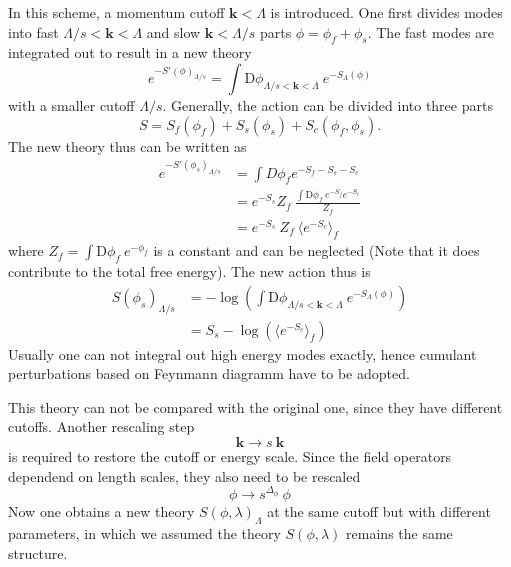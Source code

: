 \documentclass[submission, PhysLectNotes]{SciPost}
\begin{document}
In this scheme, a momentum cutoff $\boldsymbol{k}<\Lambda$ is introduced. One first divides modes into fast $\Lambda/s<\boldsymbol{k}<\Lambda$ and slow $\boldsymbol{k}<\Lambda/s$ parts $\phi = \phi_f +\phi_s$. The fast modes are integrated out to result in a new theory
\begin{equation}
    e^{-{S'(\phi)}_{\Lambda/s}} = \int \mathrm{D}\phi_{\Lambda/s<\boldsymbol{k}<\Lambda} \ e^{-S_{\Lambda}(\phi)}
\end{equation}
with a smaller cutoff $\Lambda/s$. Generally, the action can be divided into three parts
\begin{equation}
S = S_f(\phi_f) + S_s(\phi_s) + S_c(\phi_f,\phi_s).
\end{equation}
The new theory thus can be written as
\begin{equation}
\begin{aligned}
    e^{-{S'(\phi_s)}_{\Lambda/s}} &= \int D\phi_f e^{-S_f - S_s - S_c} \\
    &= e^{-S_s} Z_f \ \frac{\int \mathrm{D}\phi_f \ e^{-S_f} e^{-S_c}} {Z_f} \\
    &= e^{-S_s}\ Z_f \ \langle e^{-S_c} \rangle_f
\end{aligned}
\end{equation}
where $ Z_f = \int \mathrm{D}\phi_f \ e^{-\phi_f}$ is a constant and can be neglected (Note that it does contribute to the total free energy). The new action thus is
\begin{equation}
\begin{aligned}
{S(\phi_s)}_{\Lambda/s} &= -\log \left( \int \mathrm{D}\phi_{\Lambda/s<\boldsymbol{k}<\Lambda} \ e^{-S_{\Lambda}(\phi)} \right) \\
&= S_s - \log \left(\langle e^{-S_c} \rangle_f\right)
\end{aligned}
\end{equation}
Usually one can not integral out high energy modes exactly, hence cumulant perturbations based on Feynmann diagramm have to be adopted.

This theory can not be compared with the original one, since they have different cutoffs. Another rescaling step
\begin{equation}
    \boldsymbol{k} \rightarrow s\ \boldsymbol{k}
\end{equation}
is required to restore the cutoff or energy scale. Since the field operators dependend on length scales, they also need to be rescaled
\begin{equation}
     \phi \rightarrow s^{\Delta_\phi}\ \phi
\end{equation}
Now one obtains a new theory ${S(\phi,\lambda)}_\Lambda$ at the same cutoff but with different parameters, in which we assumed the theory $S(\phi,\lambda)$ remains the same structure.
\end{document}
